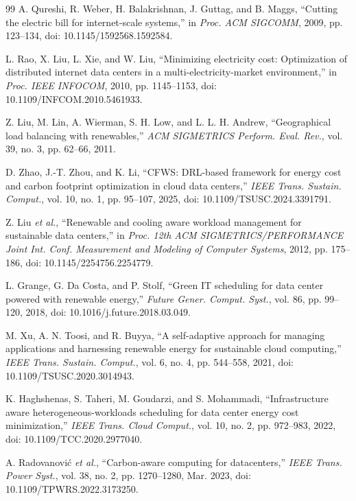 \documentclass{UNCC-thesis}
\begin{document}
\begin{thebibliography}{99}
A. Qureshi, R. Weber, H. Balakrishnan, J. Guttag, and B. Maggs, ``Cutting the
electric bill for internet-scale systems,'' in \emph{Proc. ACM SIGCOMM},
2009, pp. 123--134, doi: 10.1145/1592568.1592584.

L. Rao, X. Liu, L. Xie, and W. Liu, ``Minimizing electricity cost:
Optimization of distributed internet data centers in a
multi-electricity-market environment,'' in \emph{Proc. IEEE INFOCOM}, 2010,
pp. 1145--1153, doi: 10.1109/INFCOM.2010.5461933.

Z. Liu, M. Lin, A. Wierman, S. H. Low, and L. L. H. Andrew, ``Geographical
load balancing with renewables,'' \emph{ACM SIGMETRICS Perform. Eval. Rev.},
vol. 39, no. 3, pp. 62--66, 2011.

D. Zhao, J.-T. Zhou, and K. Li, ``CFWS: DRL-based framework for energy cost
and carbon footprint optimization in cloud data centers,'' \emph{IEEE Trans.
Sustain. Comput.}, vol. 10, no. 1, pp. 95--107, 2025,
doi: 10.1109/TSUSC.2024.3391791.

Z. Liu \emph{et al.}, ``Renewable and cooling aware workload management for sustainable
data centers,'' in \emph{Proc. 12th ACM SIGMETRICS/PERFORMANCE Joint Int.
Conf. Measurement and Modeling of Computer Systems}, 2012, pp. 175--186,
doi: 10.1145/2254756.2254779.

L. Grange, G. Da Costa, and P. Stolf, ``Green IT scheduling for data center
powered with renewable energy,'' \emph{Future Gener. Comput. Syst.}, vol. 86,
pp. 99--120, 2018, doi: 10.1016/j.future.2018.03.049.

M. Xu, A. N. Toosi, and R. Buyya, ``A self-adaptive approach for managing
applications and harnessing renewable energy for sustainable cloud
computing,'' \emph{IEEE Trans. Sustain. Comput.}, vol. 6, no. 4,
pp. 544--558, 2021, doi: 10.1109/TSUSC.2020.3014943.

K. Haghshenas, S. Taheri, M. Goudarzi, and S. Mohammadi, ``Infrastructure
aware heterogeneous-workloads scheduling for data center energy cost
minimization,'' \emph{IEEE Trans. Cloud Comput.}, vol. 10, no. 2,
pp. 972--983, 2022, doi: 10.1109/TCC.2020.2977040.

A. Radovanovi\'{c} \emph{et al.}, ``Carbon-aware computing for datacenters,''
\emph{IEEE Trans. Power Syst.}, vol. 38, no. 2, pp. 1270--1280, Mar. 2023,
doi: 10.1109/TPWRS.2022.3173250.


\end{thebibliography}
\end{document}
